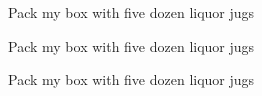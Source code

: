   \setmainfont{TeX Gyre Bonum}
  \setsansfont[Scale=MatchLowercase]{Latin Modern Sans}
  \setmonofont[Scale=MatchLowercase]{Inconsolata}

  \rmfamily Pack my box with five dozen liquor jugs\par
  \sffamily Pack my box with five dozen liquor jugs\par
  \ttfamily Pack my box with five dozen liquor jugs
